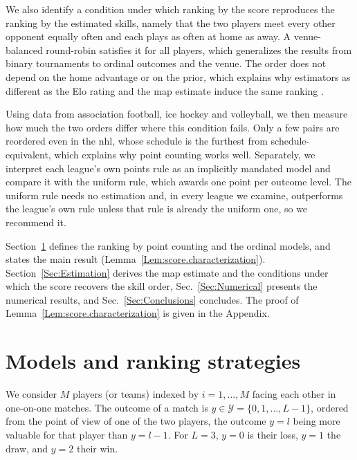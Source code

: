 \documentclass[letterpaper,12pt]{article}
\newcommand{\mc}[1]{\mathcal{#1}}
\newcommand{\set}[1]{\{#1\}}
\newcommand{\ld}{\ldots}
\newcommand{\mcY}{\mc{Y}}
\begin{document}
We also identify a condition under which ranking by the score reproduces the ranking by the estimated skills, namely that the two players meet every other opponent equally often and each plays as often at home as away. A venue-balanced round-robin satisfies it for all players, which generalizes the results from binary tournaments \citep{Zermelo29,Ford57} to ordinal outcomes and the venue. The order does not depend on the home advantage or on the prior, which explains why estimators as different as the Elo rating and the \gls{map} estimate induce the same ranking \citep{Szczecinski26b}.

Using data from association football, ice hockey and volleyball, we then measure how much the two orders differ where this condition fails. Only a few pairs are reordered even in the \gls{nhl}, whose schedule is the furthest from schedule-equivalent, which explains why point counting works well. Separately, we interpret each league's own points rule as an implicitly mandated model and compare it with the uniform rule, which awards one point per outcome level. The uniform rule needs no estimation and, in every league we examine, outperforms the league's own rule unless that rule is already the uniform one, so we recommend it.

Section~\ref{Sec:Model} defines the ranking by point counting and the ordinal models, and states the main result (Lemma~\ref{Lem:score.characterization}). Section~\ref{Sec:Estimation} derives the \gls{map} estimate and the conditions under which the score recovers the skill order, Sec.~\ref{Sec:Numerical} presents the numerical results, and Sec.~\ref{Sec:Conclusions} concludes. The proof of Lemma~\ref{Lem:score.characterization} is given in the Appendix.

\section{Models and ranking strategies}\label{Sec:Model}

We consider $M$ players (or teams) indexed by $i=1,\ld,M$ facing each other in one-on-one matches. The outcome of a match is $y\in\mcY=\set{0,1,\ld,L-1}$, ordered from the point of view of one of the two players, the outcome $y=l$ being more valuable for that player than $y=l-1$. For $L=3$, $y=0$ is their loss, $y=1$ the draw, and $y=2$ their win.
\end{document}
